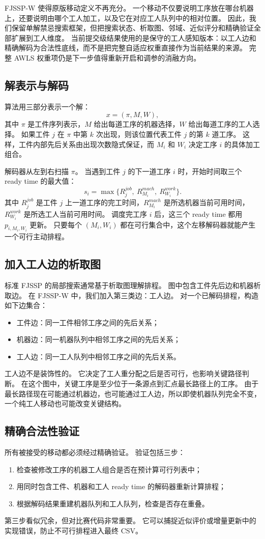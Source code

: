 \documentclass[UTF8,a4paper,zihao=-4]{ctexart}
\begin{document}
FJSSP-W 使得原版移动定义不再充分。
一个移动不仅要说明工序放在哪台机器上，还要说明由哪个工人加工，以及它在对应工人队列中的相对位置。
因此，我们保留单解禁忌搜索框架，但把搜索状态、析取图、邻域、近似评分和精确验证全部扩展到工人维度。
当前提交级结果使用的是保守的工人感知版本：以工人边和精确解码为合法性底线，而不是把完整自适应权重直接作为当前结果的来源。
完整 AWLS 权重项仍是下一步值得重新开启和调参的消融方向。

\subsection{解表示与解码}
算法用三部分表示一个解：
\[
  x=(\pi,M,W),
\]
其中 $\pi$ 是工件序列表示，$M$ 给出每道工序的机器选择，$W$ 给出每道工序的工人选择。
如果工件 $j$ 在 $\pi$ 中第 $k$ 次出现，则该位置代表工件 $j$ 的第 $k$ 道工序。
这样，工件内部先后关系由出现次数隐式保证，而 $M_i$ 和 $W_i$ 决定工序 $i$ 的具体加工组合。

解码器从左到右扫描 $\pi$。
当遇到工件 $j$ 的下一道工序 $i$ 时，开始时间取三个 ready time 的最大值：
\[
  s_i=\max\{R^{job}_j,\ R^{mach}_{M_i},\ R^{work}_{W_i}\}.
\]
其中 $R^{job}_j$ 是工件 $j$ 上一道工序的完工时间，$R^{mach}_{M_i}$ 是所选机器当前可用时间，$R^{work}_{W_i}$ 是所选工人当前可用时间。
调度完工序 $i$ 后，这三个 ready time 都用 $p_{i,M_i,W_i}$ 更新。
只要每个 $(M_i,W_i)$ 都在可行集合中，这个左移解码器就能产生一个可行主动排程。

\subsection{加入工人边的析取图}
标准 FJSSP 的局部搜索通常基于析取图理解排程。
图中包含工件先后边和机器析取边。
在 FJSSP-W 中，我们加入第三类边：工人边。
对一个已解码排程，构造如下边集合：
\begin{itemize}
  \item 工件边：同一工件相邻工序之间的先后关系；
  \item 机器边：同一机器队列中相邻工序之间的先后关系；
  \item 工人边：同一工人队列中相邻工序之间的先后关系。
\end{itemize}

工人边不是装饰性的。
它决定了工人重分配之后是否可行，也影响关键路径判断。
在这个图中，关键工序是至少位于一条源点到汇点最长路径上的工序。
由于最长路径现在可能通过机器边，也可能通过工人边，所以即使机器队列完全不变，一个纯工人移动也可能改变关键结构。

\subsection{精确合法性验证}
所有被接受的移动都必须经过精确验证。
验证包括三步：
\begin{enumerate}
  \item 检查被修改工序的机器工人组合是否在预计算可行列表中；
  \item 用同时包含工件、机器和工人 ready time 的解码器重新计算排程；
  \item 根据解码结果重建机器队列和工人队列，检查是否存在重叠。
\end{enumerate}
第三步看似冗余，但对比赛代码非常重要。
它可以捕捉近似评价或增量更新中的实现错误，防止不可行排程进入最终 CSV。
\end{document}
